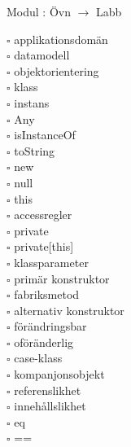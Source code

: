 
    Modul : Övn  $\rightarrow$ Labb 
    \begin{multicols}{3}\SlideFontTiny
    $\square$ applikationsdomän \\
$\square$ datamodell \\
$\square$ objektorientering \\
$\square$ klass \\
$\square$ instans \\
$\square$ Any \\
$\square$ isInstanceOf \\
$\square$ toString \\
$\square$ new \\
$\square$ null \\
$\square$ this \\
$\square$ accessregler \\
$\square$ private \\
$\square$ private[this] \\
$\square$ klassparameter \\
$\square$ primär konstruktor \\
$\square$ fabriksmetod \\
$\square$ alternativ konstruktor \\
$\square$ förändringsbar \\
$\square$ oföränderlig \\
$\square$ case-klass \\
$\square$ kompanjonsobjekt \\
$\square$ referenslikhet \\
$\square$ innehållslikhet \\
$\square$ eq \\
$\square$ == \\
    \end{multicols}
    